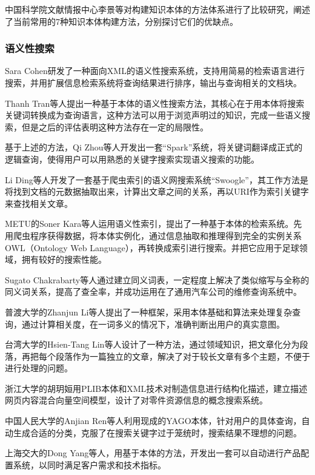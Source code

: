 \documentclass[12pt,a4paper]{article}
\begin{document}
	中国科学院文献情报中心李景\cite{11}等对构建知识本体的方法体系进行了比较研究，阐述了当前常用的7种知识本体构建方法，分别探讨它们的优缺点。
	
		\subsubsection{语义性搜索}
	Sara Cohen\cite{12}研发了一种面向XML的语义性搜索系统，支持用简易的检索语言进行搜索，并用扩展信息检索系统将查询结果进行排序，输出与查询相关的文档块。

	Thanh Tran\cite{13}等人提出一种基于本体的语义性搜索方法，其核心在于用本体将搜索关键词转换成为查询语言，这种方法可以用于浏览声明过的知识，完成一些语义搜索，但是之后的评估表明这种方法存在一定的局限性。

	基于上述的方法，Qi Zhou\cite{14}等人开发出一套“Spark”系统，将关键词翻译成正式的逻辑查询，使得用户可以用熟悉的关键字搜索实现语义搜索的功能。

	Li Ding\cite{15}等人开发了一套基于爬虫索引的语义网搜索系统“Swoogle”，其工作方法是将找到文档的元数据抽取出来，计算出文章之间的关系，再以URI作为索引关键字来查找相关文章。

	METU的Soner Kara\cite{16}等人运用语义性索引，提出了一种基于本体的检索系统。先用爬虫程序获得数据，将本体实例化，通过信息抽取和推理得到完全的实例关系OWL（Ontology Web Language），再转换成索引进行搜索。并把它应用于足球领域，拥有较好的搜索性能。

	Sugato Chakrabarty\cite{17}等人通过建立同义词表，一定程度上解决了类似缩写与全称的同义词关系，提高了查全率，并成功运用在了通用汽车公司的维修查询系统中。

	普渡大学的Zhanjun Li\cite{18}等人提出了一种框架，采用本体基础和算法来处理复杂查询，通过计算相关度，在一词多义的情况下，准确判断出用户的真实意图。

	台湾大学的Hsien-Tang Lin\cite{19}等人设计了一种方法，通过领域知识，把文章化分为段落，再把每个段落作为一篇独立的文章，解决了对于较长文章有多个主题，不便于进行处理的问题。

	浙江大学的胡玥姮用PLIB本体和XML技术对制造信息进行结构化描述，建立描述网页内容混合向量空间模型，设计了对零件资源信息的概念搜索系统。

	中国人民大学的Anjian Ren\cite{20}等人利用现成的YAGO本体，针对用户的具体查询，自动生成合适的分类，克服了在搜索关键字过于笼统时，搜索结果不理想的问题。

	上海交大的Dong Yang\cite{21}等人，用基于本体的方法，开发出一套可以自动进行产品配置系统，以同时满足客户需求和技术指标。
\end{document}
